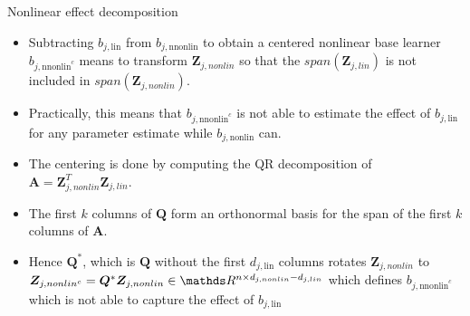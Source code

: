 \documentclass[11pt,compress,t,notes=noshow, xcolor=table]{beamer}
\begin{document}
\begin{vbframe}{Nonlinear effect decomposition}
\begin{itemize}
     \item
        Subtracting $b_{j,\text{lin}}$ from $b_{j,\text{nnonlin}}$ to obtain a centered nonlinear base learner $b_{j,\text{nnonlin}^c}$ means to transform $\bm{Z}_{j,nonlin}$ so that the $span(\bm{Z}_{j,lin})$ is not included in $span(\bm{Z}_{j,nonlin})$. 

    \item 
        Practically, this means that $b_{j,\text{nnonlin}^c}$ is not able to estimate the effect of $b_{j,\text{lin}}$ for any parameter estimate while $b_{j,\text{nonlin}}$ can.

    \item
        The centering is done by computing the QR decomposition of $\bm{A} = \bm{Z}_{j,nonlin}^T \bm{Z}_{j,lin}$.

    \item 
        The first $k$ columns of $\bm{Q}$ form an orthonormal basis for the span of the first $k$ columns of $\bm{A}$.

    \item Hence $\bm{Q}^\ast$, which is $\bm{Q}$ without the first $d_{j,\text{lin}}$ columns rotates $\bm{Z}_{j,nonlin}$ to $\bm{Z}_{j,nonlin^c} = \bm{Q}^\ast\bm{Z}_{j,nonlin}\in\R^{n\times d_{j,nonlin} - d_{j,lin}}$ which defines $b_{j,\text{nnonlin}^c}$ which is not able to capture the effect of $b_{j,\text{lin}}$
\end{itemize}

\end{vbframe}
\end{document}
